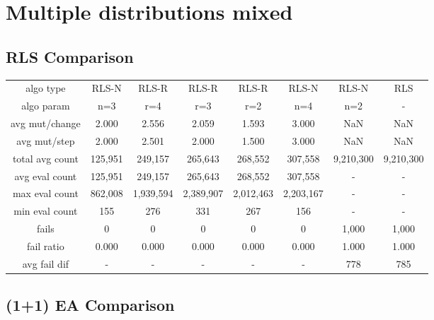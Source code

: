 
\section{Multiple distributions mixed}

\subsection{RLS Comparison}


\begin{tabular}[h]{cccccccc}
algo type&               RLS-N&        RLS-R&        RLS-R&        RLS-R&        RLS-N&        RLS-N&          RLS\\
algo param&                n=3&          r=4&          r=3&          r=2&          n=4&          n=2&            -\\
avg mut/change&          2.000&        2.556&        2.059&        1.593&        3.000&          NaN&          NaN\\
avg mut/step&            2.000&        2.501&        2.000&        1.500&        3.000&          NaN&          NaN\\
\hline
total avg count&       125,951&      249,157&      265,643&      268,552&      307,558&    9,210,300&    9,210,300\\
avg eval count&        125,951&      249,157&      265,643&      268,552&      307,558&            -&            -\\
max eval count&        862,008&    1,939,594&    2,389,907&    2,012,463&    2,203,167&            -&            -\\
min eval count&            155&          276&          331&          267&          156&            -&            -\\
\hline
fails&                       0&            0&            0&            0&            0&        1,000&        1,000\\
fail ratio&              0.000&        0.000&        0.000&        0.000&        0.000&        1.000&        1.000\\
avg fail dif&                -&            -&            -&            -&            -&          778&          785\\
\end{tabular}


\subsection{(1+1) EA Comparison}


